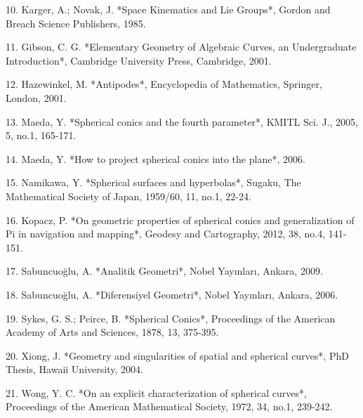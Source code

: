 10. Karger, A.; Novak, J. *Space Kinematics and Lie Groups*, Gordon and Breach Science Publishers, 1985.

11. Gibson, C. G. *Elementary Geometry of Algebraic Curves, an Undergraduate Introduction*, Cambridge University Press, Cambridge, 2001.

12. Hazewinkel, M. *Antipodes*, Encyclopedia of Mathematics, Springer, London, 2001.

13. Maeda, Y. *Spherical conics and the fourth parameter*, KMITL Sci. J., 2005, 5, no.1, 165-171.

14. Maeda, Y. *How to project spherical conics into the plane*, 2006.

15. Namikawa, Y. *Spherical surfaces and hyperbolas*, Sugaku, The Mathematical Society of Japan, 1959/60, 11, no.1, 22-24.

16. Kopacz, P. *On geometric properties of spherical conics and generalization of Pi in navigation and mapping*, Geodesy and Cartography, 2012, 38, no.4, 141-151.

17. Sabuncuoğlu, A. *Analitik Geometri*, Nobel Yayınları, Ankara, 2009.

18. Sabuncuoğlu, A. *Diferensiyel Geometri*, Nobel Yayınları, Ankara, 2006.

19. Sykes, G. S.; Peirce, B. *Spherical Conics*, Proceedings of the American Academy of Arts and Sciences, 1878, 13, 375-395.

20. Xiong, J. *Geometry and singularities of spatial and spherical curves*, PhD Thesis, Hawaii University, 2004.

21. Wong, Y. C. *On an explicit characterization of spherical curves*, Proceedings of the American Mathematical Society, 1972, 34, no.1, 239-242.


